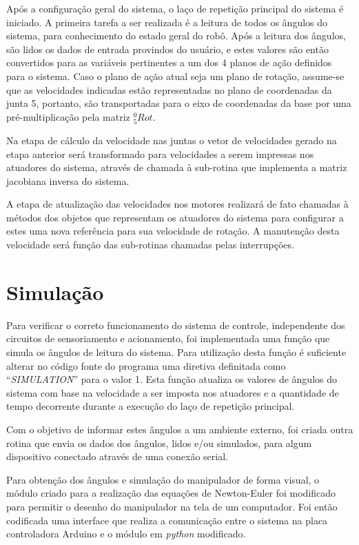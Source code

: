 Após a configuração geral do sistema, o laço de repetição principal do sistema é iniciado. 
A primeira tarefa a ser realizada é a leitura de todos os ângulos do sistema, para conhecimento
do estado geral do robô. Após a leitura dos ângulos, são lidos os dados de entrada provindos do 
usuário, e estes valores são então convertidos para as variáveis pertinentes a um dos 4 planos de
ação definidos para o sistema.
Caso o plano de ação 
atual seja um plano de rotação, assume-se que as velocidades indicadas estão representadas no
plano de coordenadas da junta 5, portanto, são transportadas para o eixo de coordenadas da base
por uma pré-multiplicação pela matriz $^0_5Rot$.

Na etapa de cálculo da velocidade nas juntas o vetor de velocidades gerado na etapa anterior será 
transformado para velocidades a serem impressas nos atuadores do sistema, através de chamada
à sub-rotina que implementa a matriz jacobiana inversa do sistema.

A etapa de atualização das velocidades nos motores realizará de fato chamadas à métodos
dos objetos que representam os atuadores do sistema para configurar a estes uma nova referência 
para sua velocidade de rotação. A manutenção desta velocidade será função das sub-rotinas 
chamadas pelas interrupções.

\section{Simulação}

Para verificar o correto funcionamento do sistema de controle, independente dos circuitos de
sensoriamento e acionamento, foi implementada uma função que simula os ângulos de leitura do sistema. 
Para utilização desta função é suficiente alterar no código fonte do programa uma diretiva
definitada como ``\textit{SIMULATION}'' para o valor 1.
Esta função atualiza os valores de ângulos do sistema com base na velocidade a ser imposta nos atuadores
e a quantidade de tempo decorrente durante a execução do laço de repetição principal. 

Com o objetivo de informar estes ângulos a um ambiente externo, foi criada outra rotina que envia os dados 
dos ângulos, lidos e/ou simulados, para algum dispositivo conectado através de uma conexão serial.

Para obtenção dos ângulos e simulação do manipulador de forma visual, o módulo criado para a 
realização das equações de Newton-Euler foi modificado para permitir o desenho do manipulador
na tela de um computador. Foi então codificada uma interface que realiza a comunicação entre o 
sistema na placa controladora Arduino e o módulo em \textit{python} modificado.

